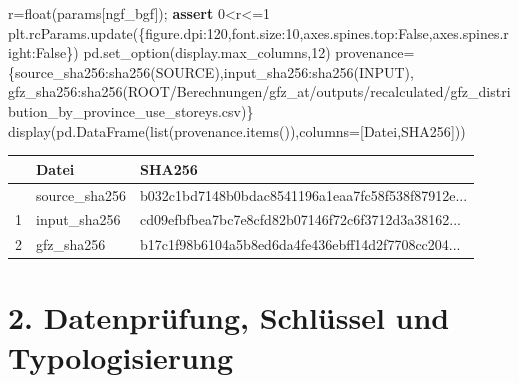 \documentclass[
  ngerman,
  a4paper,
  DIV=11]{scrreprt}
\newenvironment{Shaded}{\begin{snugshade}}{\end{snugshade}}
\newcommand{\BuiltInTok}[1]{\textcolor[rgb]{0.00,0.23,0.31}{#1}}
\newcommand{\ControlFlowTok}[1]{\textcolor[rgb]{0.00,0.23,0.31}{\textbf{#1}}}
\newcommand{\DecValTok}[1]{\textcolor[rgb]{0.68,0.00,0.00}{#1}}
\newcommand{\NormalTok}[1]{\textcolor[rgb]{0.00,0.23,0.31}{#1}}
\newcommand{\OperatorTok}[1]{\textcolor[rgb]{0.37,0.37,0.37}{#1}}
\newcommand{\StringTok}[1]{\textcolor[rgb]{0.13,0.47,0.30}{#1}}
\newcommand{\VariableTok}[1]{\textcolor[rgb]{0.07,0.07,0.07}{#1}}
\newcounter{none} %
\begin{document}
\begin{Shaded}
\begin{Highlighting}[]
\NormalTok{r}\OperatorTok{=}\BuiltInTok{float}\NormalTok{(params[}\StringTok{\textquotesingle{}ngf\_bgf\textquotesingle{}}\NormalTok{])}\OperatorTok{;} \ControlFlowTok{assert} \DecValTok{0}\OperatorTok{\textless{}}\NormalTok{r}\OperatorTok{\textless{}=}\DecValTok{1}
\NormalTok{plt.rcParams.update(\{}\StringTok{\textquotesingle{}figure.dpi\textquotesingle{}}\NormalTok{:}\DecValTok{120}\NormalTok{,}\StringTok{\textquotesingle{}font.size\textquotesingle{}}\NormalTok{:}\DecValTok{10}\NormalTok{,}\StringTok{\textquotesingle{}axes.spines.top\textquotesingle{}}\NormalTok{:}\VariableTok{False}\NormalTok{,}\StringTok{\textquotesingle{}axes.spines.right\textquotesingle{}}\NormalTok{:}\VariableTok{False}\NormalTok{\})}
\NormalTok{pd.set\_option(}\StringTok{\textquotesingle{}display.max\_columns\textquotesingle{}}\NormalTok{,}\DecValTok{12}\NormalTok{)}
\NormalTok{provenance}\OperatorTok{=}\NormalTok{\{}\StringTok{\textquotesingle{}source\_sha256\textquotesingle{}}\NormalTok{:sha256(SOURCE),}\StringTok{\textquotesingle{}input\_sha256\textquotesingle{}}\NormalTok{:sha256(INPUT),}
 \StringTok{\textquotesingle{}gfz\_sha256\textquotesingle{}}\NormalTok{:sha256(ROOT}\OperatorTok{/}\StringTok{\textquotesingle{}Berechnungen/gfz\_at/outputs/recalculated/gfz\_distribution\_by\_province\_use\_storeys.csv\textquotesingle{}}\NormalTok{)\}}
\NormalTok{display(pd.DataFrame(}\BuiltInTok{list}\NormalTok{(provenance.items()),columns}\OperatorTok{=}\NormalTok{[}\StringTok{\textquotesingle{}Datei\textquotesingle{}}\NormalTok{,}\StringTok{\textquotesingle{}SHA256\textquotesingle{}}\NormalTok{]))}
\end{Highlighting}
\end{Shaded}

{\def\LTcaptype{none} %
\begin{longtable}[]{@{}lll@{}}
\toprule\noalign{}
& Datei & SHA256 \\
\midrule\noalign{}
\endhead
\bottomrule\noalign{}
\endlastfoot
0 & source\_sha256 &
b032c1bd7148b0bdac8541196a1eaa7fc58f538f87912e... \\
1 & input\_sha256 & cd09efbfbea7bc7e8cfd82b07146f72c6f3712d3a38162... \\
2 & gfz\_sha256 & b17c1f98b6104a5b8ed6da4fe436ebff14d2f7708cc204... \\
\end{longtable}
}

\section{2. Datenprüfung, Schlüssel und
Typologisierung}\label{sec-gebaeude-datenpruefung}
\end{document}
